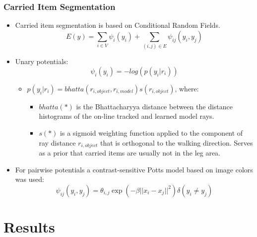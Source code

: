 \documentclass{beamer}
\begin{document}
\begin{frame}
\frametitle{Carried Item Segmentation} 
\begin{itemize}
	\item Carried item segmentation is based on Conditional Random Fields.
$$E(y) = \underset{i \in V}{\sum}\psi_{i}(y_i) + \underset{(i,j) \in E}{\sum}\psi_{i j}(y_i,y_j)$$
	\item Unary potentials: $$\psi_{i}(y_i) = -log(p(y_i|r_i))$$
	\begin {itemize}
		\item $p(y_i|r_i) = bhatta(r_{i,object}, r_{i,model})s(r_{i,object})$, where:
		\begin{itemize}
			\item $bhatta(*)$ is the Bhattacharyya distance between the distance histograms of the on-line tracked and learned model rays.
			\item $s(*)$ is a sigmoid weighting function applied to the component of ray distance $r_{i,object}$ that is orthogonal to the walking direction. Serves as a prior that carried items are usually not in the leg area.
		\end{itemize} 
	\end{itemize}
	\item For pairwise potentials a contrast-sensitive Potts model based on image colors was used: $$\psi_{i j}(y_i,y_j) = \theta_{i,j}\exp(-\beta||x_i-x_j||^2)\delta(y_i \neq y_j) $$
\end{itemize}
\end{frame}

\section{Results}
\end{document}
